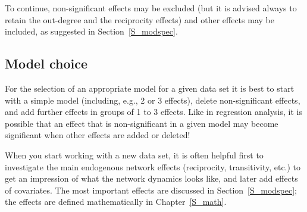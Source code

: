 \documentclass[a4paper,fleqn,11pt]{article}
\newcommand{\+}{\, + \,}
\begin{document}
To continue,  non-significant effects may
be excluded (but it is advised always to retain the out-degree and
the reciprocity effects) and other effects may be included,
as suggested in Section~\ref{S_modspec}.

\subsection{Model choice}
\label{S_model}

For the selection of an appropriate model for a given data set it
is best to start with a simple model (including, e.g., 2 or 3
effects), delete non-significant effects, and add further effects
in groups of 1 to 3 effects. Like in regression analysis, it is
possible that an effect that is non-significant in a given model
may become significant when other effects are added or deleted!

When you start working with a new data set, it is often helpful first
to investigate the main endogenous network effects (reciprocity,
transitivity, etc.) to get an impression of what the network
dynamics looks like, and later add effects of covariates.
The most important effects are discussed in Section~\ref{S_modspec};
the effects are defined mathematically
in Chapter~\ref{S_math}.
\end{document}
